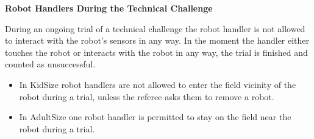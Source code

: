\bigskip

{\bfseries Robot Handlers During the Technical Challenge}

\headlinebox

During an ongoing trial of a technical challenge the robot handler is not allowed to interact with the robot's sensors in any way. In the moment the handler either touches the robot or interacts with the robot in any way, the trial is finished and counted as unsuccessful.

\begin{itemize}
\item In KidSize  robot handlers are not allowed to enter
      the field vicinity of the robot during a trial,
      unless the referee asks them to remove a robot.
\item In AdultSize one robot handler is permitted to stay on the field near the robot during a trial.
\end{itemize}
